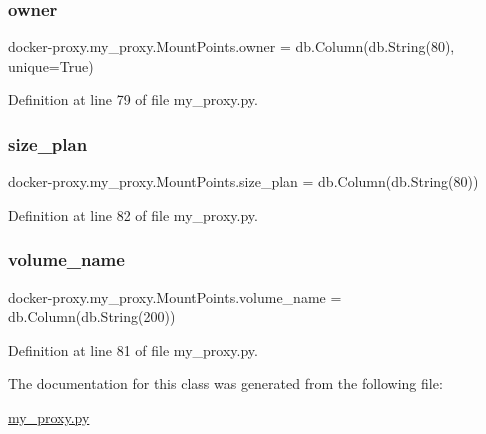 \subsubsection{\texorpdfstring{owner}{owner}}
{\footnotesize\ttfamily docker-\/proxy.\+my\+\_\+proxy.\+Mount\+Points.\+owner = db.\+Column(db.\+String(80), unique=True)\hspace{0.3cm}{\ttfamily [static]}}



Definition at line 79 of file my\+\_\+proxy.\+py.

\hypertarget{classdocker-proxy_1_1my__proxy_1_1_mount_points_a6008b3f58ac2dd027f1d637cc84ee78c}{}\label{classdocker-proxy_1_1my__proxy_1_1_mount_points_a6008b3f58ac2dd027f1d637cc84ee78c} 
\subsubsection{\texorpdfstring{size\+\_\+plan}{size\_plan}}
{\footnotesize\ttfamily docker-\/proxy.\+my\+\_\+proxy.\+Mount\+Points.\+size\+\_\+plan = db.\+Column(db.\+String(80))\hspace{0.3cm}{\ttfamily [static]}}



Definition at line 82 of file my\+\_\+proxy.\+py.

\hypertarget{classdocker-proxy_1_1my__proxy_1_1_mount_points_aec1c878c659bd308f99b529d397d85c7}{}\label{classdocker-proxy_1_1my__proxy_1_1_mount_points_aec1c878c659bd308f99b529d397d85c7} 
\subsubsection{\texorpdfstring{volume\+\_\+name}{volume\_name}}
{\footnotesize\ttfamily docker-\/proxy.\+my\+\_\+proxy.\+Mount\+Points.\+volume\+\_\+name = db.\+Column(db.\+String(200))\hspace{0.3cm}{\ttfamily [static]}}



Definition at line 81 of file my\+\_\+proxy.\+py.



The documentation for this class was generated from the following file\+:\begin{DoxyCompactItemize}
\item 
\hyperlink{my__proxy_8py}{my\+\_\+proxy.\+py}\end{DoxyCompactItemize}
